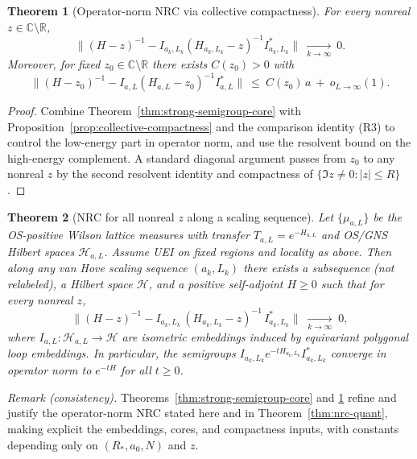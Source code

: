 \documentclass[11pt]{amsart}
\theoremstyle{plain}
\newtheorem{theorem}{Theorem}[section]
\theoremstyle{definition}
\theoremstyle{remark}
\begin{document}
\begin{theorem}[Operator-norm NRC via collective compactness]\label{thm:nrc-operator-norm}
For every nonreal $z\in\mathbb C\setminus\mathbb R$,
\[
  \big\|(H-z)^{-1} - I_{a_k,L_k}(H_{a_k,L_k}-z)^{-1} I_{a_k,L_k}^*\big\|\ \xrightarrow[k\to\infty]{}\ 0.
\]
Moreover, for fixed $z_0\in\mathbb C\setminus\mathbb R$ there exists $C(z_0)>0$ with
\[
  \big\|(H-z_0)^{-1} - I_{a,L}(H_{a,L}-z_0)^{-1} I_{a,L}^*\big\|\ \le\ C(z_0)\,a\ +\ o_{L\to\infty}(1).
\]
\end{theorem}
\begin{proof}
Combine Theorem~\ref{thm:strong-semigroup-core} with Proposition~\ref{prop:collective-compactness} and the comparison identity (R3) to control the low-energy part in operator norm, and use the resolvent bound on the high-energy complement. A standard diagonal argument passes from $z_0$ to any nonreal $z$ by the second resolvent identity and compactness of $\{\Im z\ne 0:|z|\le R\}$.
\end{proof}

\begin{theorem}[NRC for all nonreal $z$ along a scaling sequence]\label{thm:nrc-embeddings}
Let $\{\mu_{a,L}\}$ be the OS-positive Wilson lattice measures with transfer $T_{a,L}=e^{-H_{a,L}}$ and OS/GNS Hilbert spaces $\mathcal H_{a,L}$. Assume UEI on fixed regions and locality as above. Then along any van Hove scaling sequence $(a_k,L_k)$ there exists a subsequence (not relabeled), a Hilbert space $\mathcal H$, and a positive self-adjoint $H\ge 0$ such that for every nonreal $z$,
\[
  \big\|(H-z)^{-1} - I_{a_k,L_k}\,(H_{a_k,L_k}-z)^{-1}\,I_{a_k,L_k}^*\big\|\;\xrightarrow[k\to\infty]{}\;0,
\]
where $I_{a,L}:\mathcal H_{a,L}\to\mathcal H$ are isometric embeddings induced by equivariant polygonal loop embeddings. In particular, the semigroups $I_{a_k,L_k} e^{-tH_{a_k,L_k}} I_{a_k,L_k}^*$ converge in operator norm to $e^{-tH}$ for all $t\ge 0$.
\end{theorem}

\noindent\emph{Remark (consistency).} Theorems~\ref{thm:strong-semigroup-core} and \ref{thm:nrc-operator-norm} refine and justify the operator-norm NRC stated here and in Theorem~\ref{thm:nrc-quant}, making explicit the embeddings, cores, and compactness inputs, with constants depending only on $(R_*,a_0,N)$ and $z$.
\end{document}
